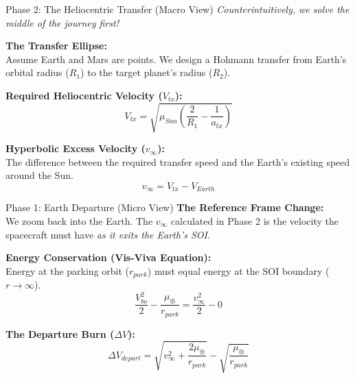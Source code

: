 \documentclass[11pt]{beamer}
\begin{document}
\begin{frame}{Phase 2: The Heliocentric Transfer (Macro View)}
    \textit{Counterintuitively, we solve the middle of the journey first!}
    
    \vspace{0.3cm}
    \textbf{The Transfer Ellipse:} \\
    Assume Earth and Mars are points. We design a Hohmann transfer from Earth's orbital radius ($R_1$) to the target planet's radius ($R_2$).
    
    \vspace{0.3cm}
    \textbf{Required Heliocentric Velocity ($V_{tx}$):}
    \begin{equation}
        V_{tx} = \sqrt{\mu_{Sun} \left( \frac{2}{R_1} - \frac{1}{a_{tx}} \right)}
    \end{equation}
    
    \vspace{0.3cm}
    \textbf{Hyperbolic Excess Velocity ($v_\infty$):} \\
    The difference between the required transfer speed and the Earth's existing speed around the Sun.
    \begin{equation}
        v_{\infty} = V_{tx} - V_{Earth}
    \end{equation}
\end{frame}

\begin{frame}{Phase 1: Earth Departure (Micro View)}
    \textbf{The Reference Frame Change:} \\
    We zoom back into the Earth. The $v_\infty$ calculated in Phase 2 is the velocity the spacecraft must have \textit{as it exits the Earth's SOI}.
    
    \vspace{0.3cm}
    \textbf{Energy Conservation (Vis-Viva Equation):} \\
    Energy at the parking orbit ($r_{park}$) must equal energy at the SOI boundary ($r \to \infty$).
    \begin{equation}
        \frac{V_{bo}^2}{2} - \frac{\mu_{\oplus}}{r_{park}} = \frac{v_\infty^2}{2} - 0
    \end{equation}
    
    \vspace{0.3cm}
    \textbf{The Departure Burn ($\Delta V$):}
    \begin{equation}
        \Delta V_{depart} = \sqrt{v_\infty^2 + \frac{2\mu_{\oplus}}{r_{park}}} - \sqrt{\frac{\mu_{\oplus}}{r_{park}}}
    \end{equation}
\end{frame}
\end{document}
